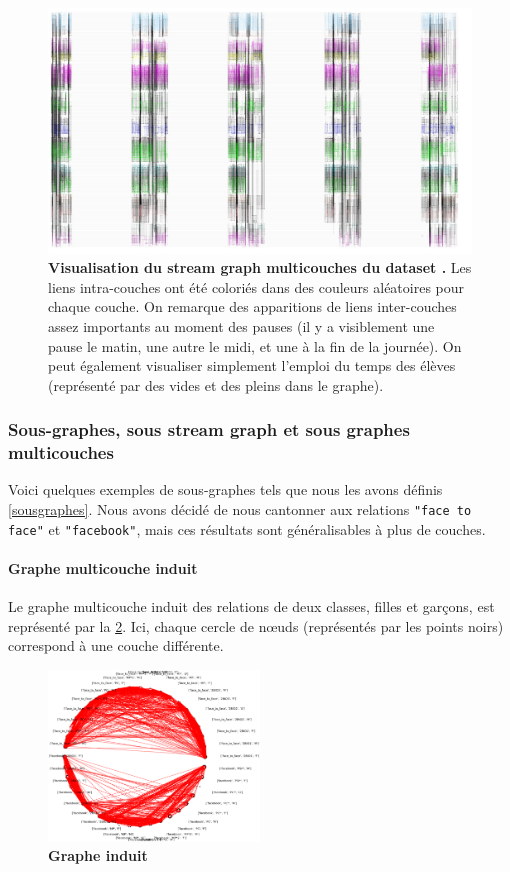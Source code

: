 \documentclass[11pt,a4paper]{article}
\theoremstyle{definition}
\theoremstyle{remark}
\theoremstyle{remark}
\def \stg {stream graph}
\def \stgm {stream graph multicouches}
\begin{document}
	\begin{figure}[h]
	\includegraphics[width=\textwidth]{lyceeentier.JPG}
	\caption{\textbf{Visualisation du \stgm{} du dataset \cite{cpge}.} Les liens intra-couches ont été coloriés dans des couleurs aléatoires pour chaque couche. On remarque des apparitions de liens inter-couches assez importants au moment des \og pauses \fg{} (il y a visiblement une pause le matin, une autre le midi, et une à la fin de la journée). On peut également visualiser simplement l'emploi du temps des élèves (représenté par des vides et des pleins dans le graphe).}
	\label{lyceeentier}
\end{figure}





\subsubsection{Sous-graphes, sous \stg{} et sous graphes multicouches}

Voici quelques exemples de sous-graphes tels que nous les avons définis \cref{sousgraphes}. Nous avons décidé de nous cantonner aux relations \texttt{"face to face"} et \texttt{"facebook"}, mais ces résultats sont généralisables à plus de couches.

\paragraph{Graphe multicouche induit}
	Le graphe multicouche induit des relations de deux classes, filles et garçons, est représenté par la \cref{completinduit}. Ici, chaque cercle de n\oe{}uds (représentés par les points noirs) correspond à une couche différente.
	
\begin{figure}[H]
	\centering
	\includegraphics[width=0.5\textwidth]{tout.png}
	\caption{\textbf{Graphe induit}}
	\label{completinduit}
\end{figure}
\end{document}
